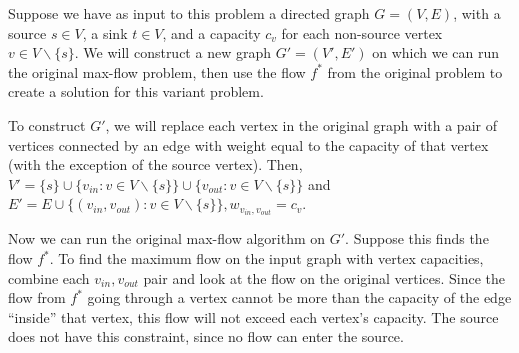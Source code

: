 \documentclass[12pt]{amsart}
\theoremstyle{plain}
\theoremstyle{definition}
\theoremstyle{remark}
\begin{document}
	\begin{tcolorbox}
		Suppose we have as input to this problem a directed graph $G = (V,E)$, with a source $s \in V$, a sink $t \in V$, and a capacity $c_v$ for each non-source vertex $v \in V \backslash \{s\}$.  We will construct a new graph $G' = (V', E')$ on which we can run the original max-flow problem, then use the flow $f^*$ from the original problem to create a solution for this variant problem.
		
		To construct $G'$, we will replace each vertex in the original graph with a pair of vertices connected by an edge with weight equal to the capacity of that vertex (with the exception of the source vertex).  Then, $V' = \{s\} \cup \{v_{in} : v \in V \backslash \{s\}\} \cup \{v_{out} : v \in V \backslash \{s\}\}$ and $E' = E \cup \{(v_{in},v_{out}) : v \in V \backslash \{s\}\}, w_{v_{in},v_{out}}=c_v$.
		
		Now we can run the original max-flow algorithm on $G'$.  Suppose this finds the flow $f^*$.  To find the maximum flow on the input graph with vertex capacities, combine each $v_{in},v_{out}$ pair and look at the flow on the original vertices.  Since the flow from $f^*$ going through a vertex cannot be more than the capacity of the edge ``inside'' that vertex, this flow will not exceed each vertex's capacity.  The source does not have this constraint, since no flow can enter the source.
	\end{tcolorbox}






	
\end{document}
